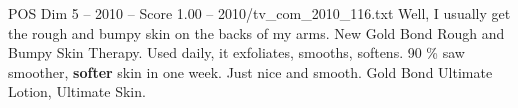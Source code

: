 \begin{textsample}{POS Dim 5 – 2010 – Score 1.00 – 2010/tv\_com\_2010\_116.txt}  \label{ex:f5_pos_075}
Well, I usually get the rough and bumpy skin on the backs of my arms.
New Gold Bond Rough and Bumpy Skin Therapy.
Used daily, it exfoliates, smooths, softens. 90 \% saw smoother, \textbf{softer} skin in one week.
Just nice and smooth.
Gold Bond Ultimate Lotion, Ultimate Skin.

\end{textsample}
